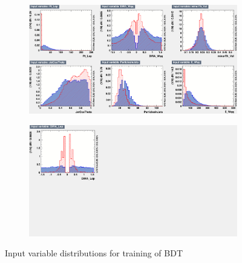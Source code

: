 \begin{figure}[h]
  \centering
  \captionsetup[subfigure]{labelformat=empty}
  \begin{subfigure}[b]{1.0\textwidth}
    \includegraphics[width=1\linewidth]{figures/variables3}
    \caption{}
    \label{3}
  \end{subfigure}
  \begin{subfigure}[b]{1.0\textwidth}
    \includegraphics[width=1\linewidth]{figures/variables4}
    \caption{}
    \label{4}
  \end{subfigure}
      \caption{Input variable distributions for training of BDT}
\end{figure}

\clearpage


